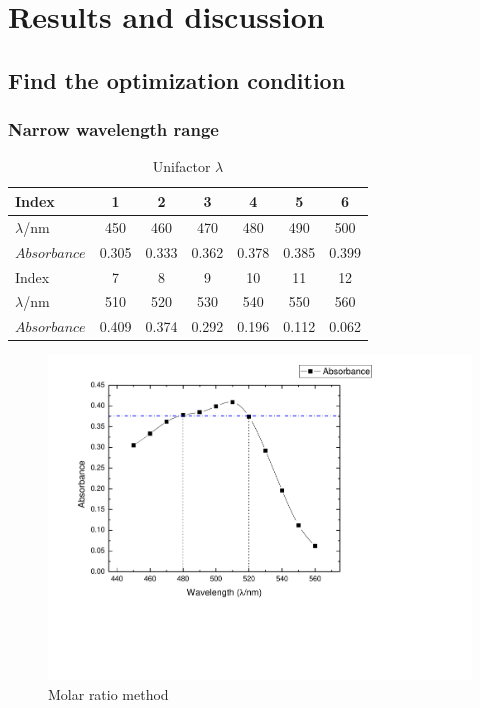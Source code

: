 \ifx\SUM\undefined


\fi

\section{Results and discussion}

\subsection{Find the optimization condition}
\subsubsection{Narrow wavelength range}
\begin{table}[H]
	\caption{Unifactor $\lambda$}
	\label{Tab.Uni}
	\begin{tabular}{lcccccc}
	\toprule
	Index			&1		&2		&3		&4		&5		&6		\\
	\midrule
	$\lambda$/nm	&450	&460	&470	&480	&490	&500	\\
	$Absorbance$	&0.305	&0.333	&0.362	&0.378	&0.385	&0.399	\\
	\midrule
	Index			&7		&8		&9		&10		&11		&12		\\
	\midrule
	$\lambda$/nm	&510	&520	&530	&540	&550	&560	\\
	$Absorbance$	&0.409	&0.374	&0.292	&0.196	&0.112	&0.062	\\
	\bottomrule
	\end{tabular}
\end{table}

\begin{figure}[H]
	\includegraphics[width=\linewidth]{Fig0.pdf}
	\caption{Molar ratio method}
	\label{fig0}
\end{figure}

